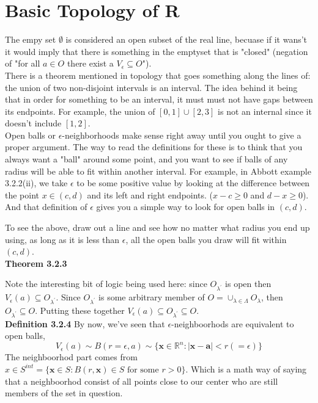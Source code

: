 \section{Basic Topology of R}

The empy set $\emptyset$ is considered an open subset of the real line, becuase if it wans't it would imply
that there is something in the emptyset that is "closed"
(negation of "for all $a\in O$ there exist a $V_\epsilon \subseteq O$").
\\

There is a theorem mentioned in topology that goes something along the lines of:
the union of two non-disjoint intervals is an interval.
The idea behind it being that in order for something to be an interval, it must must not have gaps
between its endpoints.
For example, the union of $[0,1] \cup [2,3]$ is not an internal since it doesn't include $[1,2]$.
\\

Open balls or $\epsilon$-neighborhoods make sense right away until you ought to give a proper argument.
The way to read the definitions for these is to think that you always want a "ball" around some
point, and you want to see if balls of any radius will be able to fit within another interval.
For example, in Abbott example 3.2.2(ii), we take $\epsilon$ to be some positive value by
looking at the difference between the point $x\in(c,d)$ and its left and right endpoints.
($x-c \geq 0$ and $d-x \geq 0$).
And that definition of $\epsilon$ gives you a simple way to look for open balls in $(c,d)$.

To see the above, draw out a line and see how no matter what radius you end up using, as long as
it is less than $\epsilon$, all the open balls you draw will fit within $(c,d)$.
\\

\textbf{Theorem 3.2.3}

Note the interesting bit of logic being used here: since $O_{\lambda^\prime}$ is open then
$V_{\epsilon}(a) \subseteq O_{\lambda^\prime}$.
Since $O_{\lambda^\prime}$ is some arbitrary member of $O = \cup_{\lambda \in \Lambda} O_{\lambda}$,
then $O_{\lambda^\prime} \subseteq O$.
Putting these together $V_{\epsilon}(a) \subseteq O_{\lambda^\prime} \subseteq O$.
\\

\textbf{Definition 3.2.4}
By now, we've seen that $\epsilon$-neighboorhods are equivalent to open balls,
$$
V_{\epsilon} (a) \sim B(r=\epsilon, a) \sim \{ \mathbf{x}\in\mathbb{R}^n : |\mathbf{x} - \mathbf{a}| < r(=\epsilon) \}
$$
The neighboorhod part comes from $x\in S^{int} = \{ \mathbf{x}\in S : B(r,\mathbf{x}) \in S \text{ for some } r>0 \}$.
Which is a math way of saying that a neighboorhod consist of all points close to our center who are
still members of the set in question.
\\

